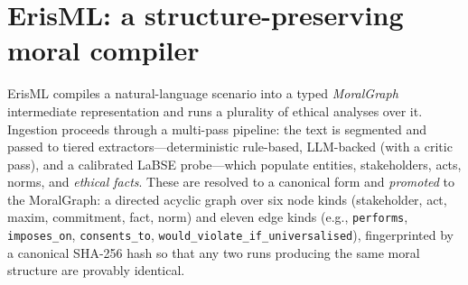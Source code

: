 \section{ErisML: a structure-preserving moral compiler}
\label{sec:erisml}

ErisML compiles a natural-language scenario into a typed \emph{MoralGraph} intermediate
representation and runs a plurality of ethical analyses over it. Ingestion proceeds through
a multi-pass pipeline: the text is segmented and passed to tiered extractors---deterministic
rule-based, LLM-backed (with a critic pass), and a calibrated LaBSE probe---which populate
entities, stakeholders, acts, norms, and \emph{ethical facts}. These are resolved to a
canonical form and \emph{promoted} to the MoralGraph: a directed acyclic graph over six node
kinds (stakeholder, act, maxim, commitment, fact, norm) and eleven edge kinds (e.g.,
\texttt{performs}, \texttt{imposes\_on}, \texttt{consents\_to},
\texttt{would\_violate\_if\_universalised}), fingerprinted by a canonical SHA-256 hash so
that any two runs producing the same moral structure are provably identical.

